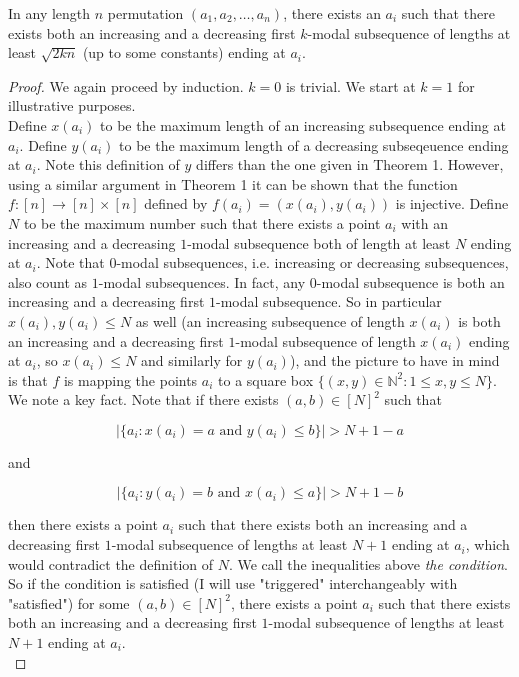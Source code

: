 \documentclass[10pt,a4paper]{amsart}
\begin{document}
\begin{theorem}
In any length $n$ permutation $(a_1, a_2, \ldots, a_n)$, there exists an $a_i$ such that there exists both an increasing and a decreasing first $k$-modal subsequence of lengths at least $\sqrt{2kn}$ (up to some constants) ending at $a_i$. 
\end{theorem}

\begin{proof}
We again proceed by induction. $k = 0$ is trivial. We start at $k = 1$ for illustrative purposes. \\

Define $x(a_i)$ to be the maximum length of an increasing subsequence ending at $a_i$. Define $y(a_i)$ to be the maximum length of a decreasing subseqeuence ending at $a_i$. Note this definition of $y$ differs than the one given in Theorem 1. However, using a similar argument in Theorem 1 it can be shown that the function $f : [n] \rightarrow [n] \times [n]$ defined by $f(a_i) = (x(a_i), y(a_i))$ is injective. Define $N$ to be the maximum number such that there exists a point $a_i$ with an increasing and a decreasing $1$-modal subsequence both of length at least $N$ ending at $a_i$. Note that $0$-modal subsequences, i.e. increasing or decreasing subsequences, also count as $1$-modal subsequences. In fact, any $0$-modal subsequence is both an increasing and a decreasing first $1$-modal subsequence. So in particular $x(a_i), y(a_i) \leq N$ as well (an increasing subsequence of length $x(a_i)$ is both an increasing and a decreasing first $1$-modal subsequence of length $x(a_i)$ ending at $a_i$, so $x(a_i) \leq N$ and similarly for $y(a_i)$), and the picture to have in mind is that $f$ is mapping the points $a_i$ to a square box $\{(x,y) \in \mathbb{N}^2 : 1 \leq x, y \leq N \}$. \\

We note a key fact. Note that if there exists $(a,b) \in [N]^2$ such that 

$$|\{a_i : x(a_i) = a \text{ and } y(a_i) \leq b\}| > N+1-a$$

and 

$$|\{a_i : y(a_i) = b \text{ and } x(a_i) \leq a\}| > N+1-b$$

then there exists a point $a_i$ such that there exists both an increasing and a decreasing first $1$-modal subsequence of lengths at least $N+1$ ending at $a_i$, which would contradict the definition of $N$. We call the inequalities above \emph{the condition}. So if the condition is satisfied (I will use "triggered" interchangeably with "satisfied") for some $(a,b) \in [N]^2$, there exists a point $a_i$ such that there exists both an increasing and a decreasing first $1$-modal subsequence of lengths at least $N+1$ ending at $a_i$. \\


\end{proof}
\end{document}

